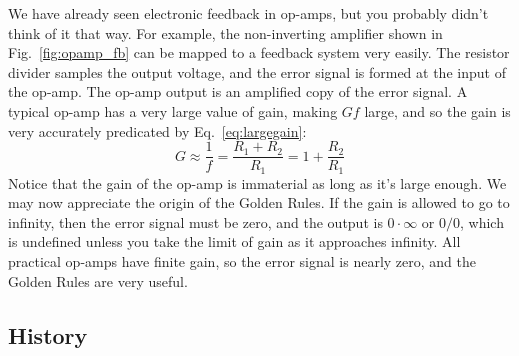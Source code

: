We have already seen electronic feedback in op-amps, but you probably didn't think of it that way.  For example, the non-inverting amplifier shown in Fig.~\ref{fig:opamp_fb} can be mapped to a feedback system very easily.  The resistor divider samples the output voltage, and the error signal is formed at the input of the op-amp.  The op-amp output is an amplified copy of the error signal.  A typical op-amp has a very large value of gain, making $G f$ large, and so the gain is very accurately predicated by Eq.~\ref{eq:largegain}:
%
\begin{equation}
	G \approx \frac{1}{f} = \frac{R_1 + R_2}{R_1} = 1 + \frac{R_2}{R_1}
\end{equation}
%
Notice that the gain of the op-amp is immaterial as long as it's large enough.  We may now appreciate the origin of the Golden Rules.  If the gain is allowed to go to infinity, then the error signal must be zero, and the output is $0 \cdot \infty$ or $0/0$, which is undefined unless you take the limit of gain as it approaches infinity.  All practical op-amps have finite gain, so the error signal is nearly zero, and the Golden Rules are very useful.  
 
 
\subsection{History}

